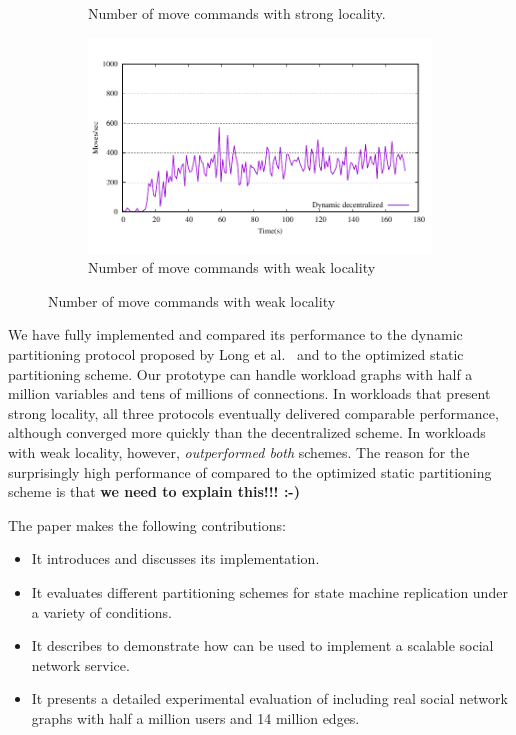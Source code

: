 \begin{figure}[t]
\begin{subfigure}[b]{0.45\textwidth}
    \caption{Number of move commands with strong locality.}
  \end{subfigure}
  \begin{subfigure}[b]{0.45\textwidth}
    \centering
    \includegraphics[width=0.95\columnwidth]{figures/motivation-moves-weak-locality}
    \caption{Number of move commands with weak locality}
  \end{subfigure} 
\end{figure}




\smallskip


We have fully implemented \dynastar and compared its performance to
the dynamic partitioning protocol proposed by Long et
al.~\cite{hoang2016} and to the optimized static partitioning scheme.
Our prototype can handle workload graphs with half a million variables
and tens of millions of connections.  In workloads that present strong
locality, all three protocols eventually delivered comparable
performance, although \dynastar converged more quickly than the
decentralized scheme.  In workloads with weak locality, however,
\dynastar \emph{outperformed both} schemes.  The reason for the
surprisingly high performance of \dynastar compared to the optimized
static partitioning scheme is that \textbf{we need to explain this!!!
  :-)}  

The paper makes the following contributions:
\begin{itemize}
\item It introduces \dynastar and discusses its implementation. 
\item It evaluates different partitioning schemes for state machine replication under a variety of conditions.
\item It describes \appname{} to demonstrate how \libname{} can be used to implement a scalable social network service.
\item It presents a detailed experimental evaluation of \dynastar including real social network graphs with half a million users and 14 million edges.
\end{itemize}

